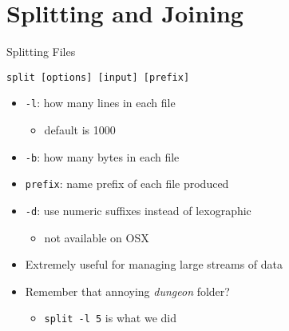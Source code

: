 %

%
\section{Splitting and Joining}
\label{sec:splitting_and_joining}

\begin{frame}[fragile]{Splitting Files}
  \begin{block}{}
    \texttt{split [options] [input] [prefix]}
    \begin{itemize}
      \item \texttt{-l}: how many lines in each file
      \begin{itemize}
        \item default is 1000
      \end{itemize}
      \item \texttt{-b}: how many bytes in each file
      \item \texttt{prefix}: name prefix of each file produced
      \item \texttt{-d}: use numeric suffixes instead of lexographic
      \begin{itemize}
        \item not available on OSX
      \end{itemize}
    \end{itemize}
  \end{block}
  \begin{itemize}[<+- | alert@+>]
    \item Extremely useful for managing large streams of data
    \item Remember that annoying \emph{dungeon} folder?
    \begin{itemize}[<+- | alert@+>]
      \item \texttt{split -l 5} is what we did
    \end{itemize}
  \end{itemize}
\end{frame}

